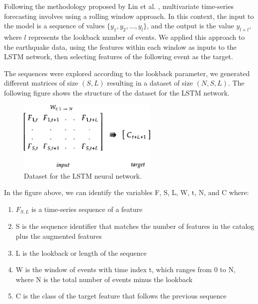 \documentclass[sn-mathphys-num]{sn-jnl}
\begin{document}
Following the methodology proposed by Lin et al. \cite{lai_modeling_2018}, multivariate time-series forecasting involves using a rolling window approach. In this context, the input to the model is a sequence of values \( \{y_1, y_2, \ldots, y_l\} \), and the output is the value \( y_{l+l} \), where \( l \) represents the lookback number of events. We applied this approach to the earthquake data, using the features within each window as inputs to the LSTM network, then selecting features of the following event as the target.

The sequences were explored according to the lookback parameter, we generated different matrices of size \( (S, L) \) resulting in a dataset of size \( (N, S, L)\). The following figure shows the structure of the dataset for the LSTM network.

\begin{figure}[H]
    \begin{center}
        \includegraphics[width=0.6\textwidth]{img/dataset.eps}
        \caption{Dataset for the LSTM neural network.\label{fig3}}
    \end{center}
\end{figure}

In the figure above, we can identify the variables F, S, L, W, t, N, and C where:

\begin{enumerate}
    \item \( F_{S,L} \) is a time-series sequence of a feature
    \item S is the sequence identifier that matches the number of features in the catalog plus the augmented features
    \item L is the lookback or length of the sequence
    \item W is the window of events with time index t, which ranges from 0 to N, where N is the total number of events minus the lookback
    \item C is the class of the target feature that follows the previous sequence
\end{enumerate}
\end{document}
